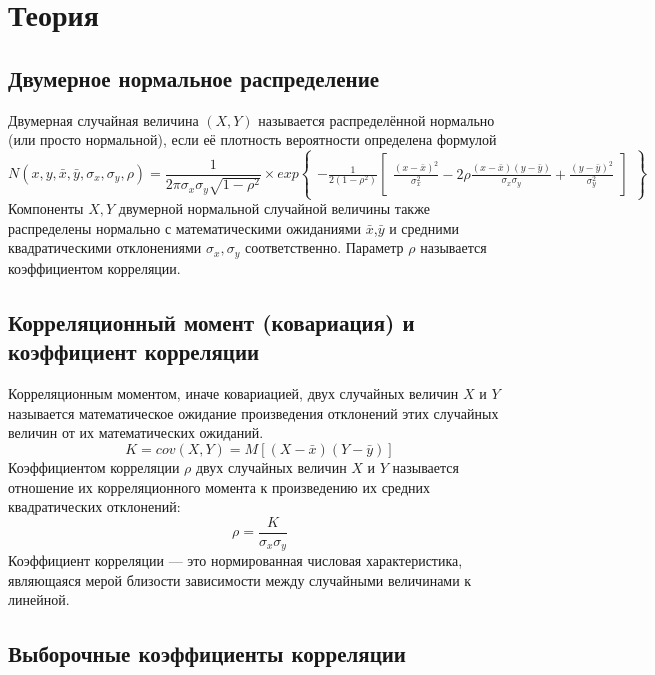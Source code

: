 \documentclass[a4paper]{article}
\begin{document}
\section{Теория}
\subsection{Двумерное нормальное распределение}
\noindent Двумерная случайная величина $(X,Y)$ называется распределённой нормально (или просто нормальной), если её плотность вероятности определена формулой
$$
N(x, y, \bar{x}, \bar{y}, \sigma_{x}, \sigma_{y}, \rho) = 
\frac{1}{2\pi\sigma_{x}\sigma_{y}\sqrt{1-\rho^{2}}} \times
exp{\begin{Bmatrix}
	-\frac{1}{2(1-\rho^{2})}
	\begin{bmatrix}
	\frac{(x-\bar{x})^{2}}{\sigma_{x}^{2}} - 2\rho\frac{(x-\bar{x})(y-\bar{y})}{\sigma_{x}\sigma_{y}} + \frac{(y-\bar{y})^{2}}{\sigma_{y}^{2}}
	\end{bmatrix}
	\end{Bmatrix}}
$$
Компоненты $X,Y$ двумерной нормальной случайной величины также распределены нормально с математическими ожиданиями $\bar{x}$,$\bar{y}$ и средними квадратическими отклонениями $\sigma_{x},\sigma_{y}$ соответственно.
Параметр $\rho$ называется коэффициентом корреляции.


\subsection{Корреляционный момент (ковариация) и коэффициент корреляции}
\noindent Корреляционным моментом, иначе ковариацией, двух случайных величин $X$ и $Y$ называется математическое ожидание произведения отклонений этих случайных величин от их математических ожиданий.
$$
K = cov(X, Y) = M[(X - \bar{x})(Y - \bar{y})]
\label{K}
$$
Коэффициентом корреляции $\rho$ двух случайных величин $X$ и $Y$ называется отношение их корреляционного момента к произведению их средних квадратических отклонений:
$$
\rho = \frac{K}{\sigma_{x}\sigma_{y}}
\label{ro}
$$
Коэффициент корреляции — это нормированная числовая характеристика, являющаяся мерой близости зависимости между случайными величинами к линейной.

\subsection{Выборочные коэффициенты корреляции}
\end{document}
